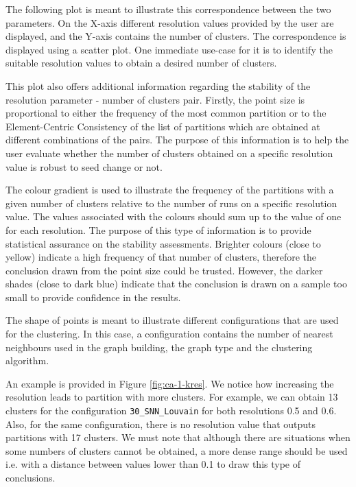 The following plot is meant to illustrate this correspondence between the two parameters. On the X-axis different resolution values provided by the user are displayed, and the Y-axis contains the number of clusters. The correspondence is displayed using a scatter plot. One immediate use-case for it is to identify the suitable resolution values to obtain a desired number of clusters. 

This plot also offers additional information regarding the stability of the resolution parameter - number of clusters pair. Firstly, the point size is proportional to either the frequency of the most common partition or to the Element-Centric Consistency of the list of partitions which are obtained at different combinations of the pairs. The purpose of this information is to help the user evaluate whether the number of clusters obtained on a specific resolution value is robust to seed change or not.

The colour gradient is used to illustrate the frequency of the partitions with a given number of clusters relative to the number of runs on a specific resolution value. The values associated with the colours should sum up to the value of one for each resolution. The purpose of this type of information is to provide statistical assurance on the stability assessments. Brighter colours (close to yellow) indicate a high frequency of that number of clusters, therefore the conclusion drawn from the point size could be trusted. However, the darker shades (close to dark blue) indicate that the conclusion is drawn on a sample too small to provide confidence in the results.

The shape of points is meant to illustrate different configurations that are used for the clustering. In this case, a configuration contains the number of nearest neighbours used in the graph building, the graph type and the clustering algorithm.

An example is provided in Figure \ref{fig:ca-1-kres}. We notice how increasing the resolution leads to partition with more clusters. For example, we can obtain 13 clusters for the configuration \verb|30_SNN_Louvain| for both resolutions 0.5 and 0.6. Also, for the same configuration, there is no resolution value that outputs partitions with 17 clusters. We must note that although there are situations when some numbers of clusters cannot be obtained, a more dense range should be used i.e. with a distance between values lower than 0.1 to draw this type of conclusions.

